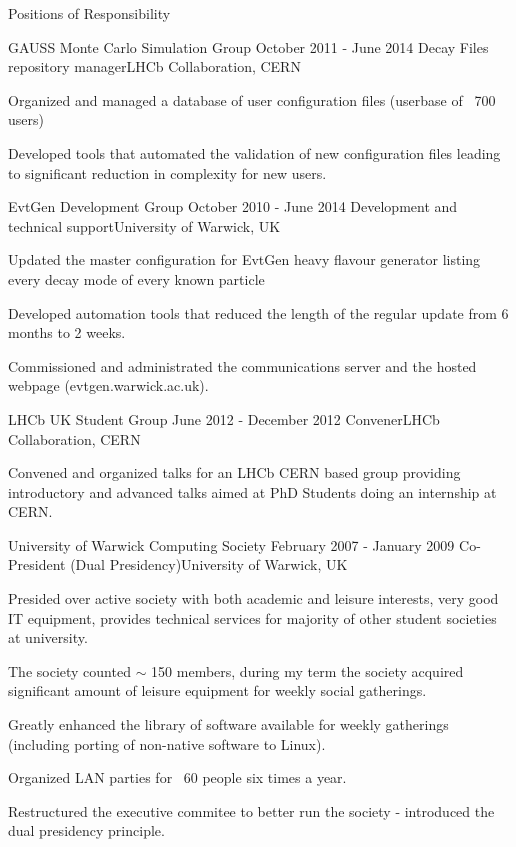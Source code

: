 \documentclass{format/resume} %
\begin{document}
\begin{rSection}{Positions of Responsibility}
\begin{rSubsection}{GAUSS Monte Carlo Simulation Group}{ October 2011 - June 2014
  }{Decay Files repository manager}{LHCb Collaboration, CERN}
\item Organized and managed a database of user configuration files (userbase of ~700 users)
\item Developed tools that automated the validation of new
  configuration files leading to significant reduction in
  complexity for new users.
\end{rSubsection}

\newpage

\begin{rSubsection}{EvtGen Development Group}{ October 2010 - June 2014 }{Development and technical support}{University of Warwick, UK}
\item Updated the master configuration for EvtGen heavy flavour
  generator listing every decay mode of every known particle
\item Developed automation tools that reduced the length of the
  regular update from 6 months to 2 weeks.
\item Commissioned and administrated the communications server and the hosted webpage (evtgen.warwick.ac.uk).
\end{rSubsection}

\begin{rSubsection}{LHCb UK Student Group}{ June 2012 - December 2012 }{Convener}{LHCb Collaboration, CERN}
\item Convened and organized talks for an LHCb CERN based group providing introductory and advanced talks aimed at PhD Students doing an internship at CERN.
\end{rSubsection}

\begin{rSubsection}{University of Warwick Computing Society}{ February 2007 - January 2009 }{Co-President (Dual Presidency)}{University of Warwick, UK}
\item Presided over active society with both academic and leisure interests, very good IT equipment, provides technical services for majority of other student societies at university.
\item The society counted $\sim$ 150 members, during my term the society acquired significant amount of leisure equipment for weekly social gatherings.
\item Greatly enhanced the library of software available for weekly gatherings (including porting of non-native software to Linux).
\item Organized LAN parties for ~60 people six times a
  year.
\item Restructured the executive commitee to better run the society -
  introduced the dual presidency principle.
\end{rSubsection}


\end{rSection}
\end{document}
